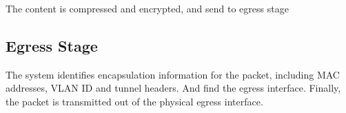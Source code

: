 The content is compressed and encrypted, and send to egress stage

\subsection*{\hypertarget{link:Egress Stage}{Egress Stage}}
\label{sec:appendix_e:sequence:egress}

The system identifies encapsulation information for the packet, including MAC addresses, VLAN ID and tunnel headers. And find the egress interface.
Finally, the packet is transmitted out of the physical egress interface.
